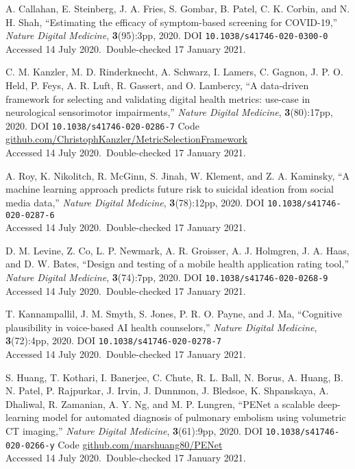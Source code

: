 \vbox{
{\sc A. Callahan, E. Steinberg, J. A. Fries, S. Gombar, B. Patel, C. K. Corbin, and N. H. Shah}, ``Estimating the efficacy of symptom-based screening for COVID-19,'' \emph{Nature Digital Medicine}, \textbf{3}(95):3pp, 2020. DOI \texttt{10.1038/s41746-020-0300-0}\\\hfill{Accessed 14 July 2020.}\ {Double-checked 17 January 2021}.}\bibskip

\vbox{
{\sc C. M. Kanzler, M. D. Rinderknecht, A. Schwarz, I. Lamers, C. Gagnon, J. P. O. Held, P. Feys, A. R. Luft, R. Gassert, and O. Lambercy}, ``A data-driven framework for selecting and validating digital health metrics: use-case in neurological sensorimotor impairments,'' \emph{Nature Digital Medicine}, \textbf{3}(80):17pp, 2020. DOI \texttt{10.1038/s41746-020-0286-7} {Code \url{github.com/ChristophKanzler/MetricSelectionFramework}}\\\hfill{Accessed 14 July 2020.}\ {Double-checked 17 January 2021}.}\bibskip

\vbox{
{\sc A. Roy, K. Nikolitch, R. McGinn, S. Jinah, W. Klement, and Z. A. Kaminsky}, ``A machine learning approach predicts future risk to suicidal ideation from social media data,'' \emph{Nature Digital Medicine}, \textbf{3}(78):12pp, 2020. DOI \texttt{10.1038/s41746-020-0287-6}\\\hfill{Accessed 14 July 2020.}\ {Double-checked 17 January 2021}.}\bibskip

\vbox{
{\sc D. M. Levine, Z. Co, L. P. Newmark, A. R. Groisser, A. J. Holmgren, J. A. Haas, and D. W. Bates}, ``Design and testing of a mobile health application rating tool,'' \emph{Nature Digital Medicine}, \textbf{3}(74):7pp, 2020. DOI \texttt{10.1038/s41746-020-0268-9}\\\hfill{Accessed 14 July 2020.}\ {Double-checked 17 January 2021}.}\bibskip

\vbox{
{\sc T. Kannampallil, J. M. Smyth, S. Jones, P. R. O. Payne, and J. Ma}, ``Cognitive plausibility in voice-based AI health counselors,'' \emph{Nature Digital Medicine}, \textbf{3}(72):4pp, 2020. DOI \texttt{10.1038/s41746-020-0278-7}\\\hfill{Accessed 14 July 2020.}\ {Double-checked 17 January 2021}.}\bibskip

\vbox{
{\sc S. Huang, T. Kothari, I. Banerjee, C. Chute, R. L. Ball, N. Borus, A. Huang, B. N. Patel, P. Rajpurkar, J. Irvin, J. Dunnmon, J. Bledsoe, K. Shpanskaya, A. Dhaliwal, R. Zamanian, A. Y. Ng, and M. P. Lungren}, ``PENet a scalable deep-learning model for automated diagnosis of pulmonary embolism using volumetric CT imaging,'' \emph{Nature Digital Medicine}, \textbf{3}(61):9pp, 2020. DOI \texttt{10.1038/s41746-020-0266-y} {Code \url{github.com/marshuang80/PENet}}\\\hfill{Accessed 14 July 2020.}\ {Double-checked 17 January 2021}.}\bibskip

